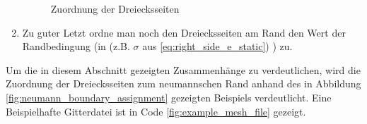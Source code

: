 \begin{enumerate}
\begin{figure}[H]
\begin{center}
		\end{center}
		\caption{Zuordnung der Dreiecksseiten}
		\label{fig:triangle_side_assignment}
	\end{figure}
	\item Zu guter Letzt ordne man noch den Dreiecksseiten am Rand den Wert der Randbedingung (in (z.B. $\sigma$ aus \ref{eq:right_side_e_static}) ) zu.
\end{enumerate}

Um die in diesem Abschnitt gezeigten Zusammenhänge zu verdeutlichen, wird die Zuordnung der Dreiecksseiten zum neumannschen Rand anhand des in Abbildung \ref{fig:neumann_boundary_assignment} gezeigten Beispiels verdeutlicht. Eine Beispielhafte Gitterdatei ist in Code \ref{fig:example_mesh_file} gezeigt.



